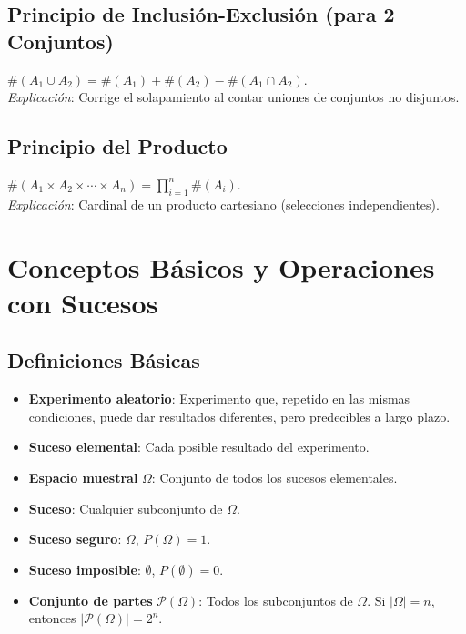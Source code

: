 \documentclass{article}
\begin{document}
\subsection{Principio de Inclusión-Exclusión (para 2 Conjuntos)}
\( \#(A_1 \cup A_2) = \#(A_1) + \#(A_2) - \#(A_1 \cap A_2) \). \\
\textit{Explicación}: Corrige el solapamiento al contar uniones de conjuntos no disjuntos.

\subsection{Principio del Producto}
\( \#(A_1 \times A_2 \times \cdots \times A_n) = \prod_{i=1}^n \#(A_i) \). \\
\textit{Explicación}: Cardinal de un producto cartesiano (selecciones independientes).

\section{Conceptos Básicos y Operaciones con Sucesos}

\subsection{Definiciones Básicas}
\begin{itemize}
    \item \textbf{Experimento aleatorio}: Experimento que, repetido en las mismas condiciones, puede dar resultados diferentes, pero predecibles a largo plazo.
    \item \textbf{Suceso elemental}: Cada posible resultado del experimento.
    \item \textbf{Espacio muestral} \(\Omega\): Conjunto de todos los sucesos elementales.
    \item \textbf{Suceso}: Cualquier subconjunto de \(\Omega\).
    \item \textbf{Suceso seguro}: \(\Omega\), \(P(\Omega) = 1\).
    \item \textbf{Suceso imposible}: \(\emptyset\), \(P(\emptyset) = 0\).
    \item \textbf{Conjunto de partes} \(\mathcal{P}(\Omega)\): Todos los subconjuntos de \(\Omega\). Si \(|\Omega| = n\), entonces \(|\mathcal{P}(\Omega)| = 2^n\).
\end{itemize}
\end{document}
